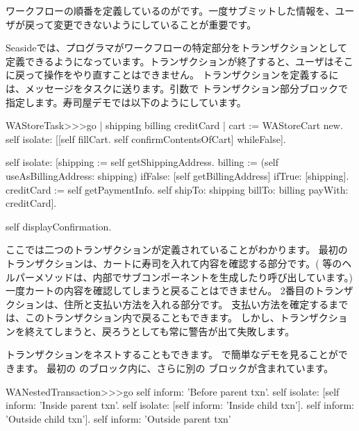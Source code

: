 \documentclass[a4paper,10pt,twoside]{book}
\begin{document}
ワークフローの順番を定義しているのがです。一度サブミットした情報を、ユーザが戻って変更できないようにしていることが重要です。


Seasideでは、プログラマがワークフローの特定部分をトランザクションとして定義できるようになっています。トランザクションが終了すると、ユーザはそこに戻って操作をやり直すことはできません。
トランザクションを定義するには、メッセージをタスクに送ります。引数で
トランザクション部分ブロックで指定します。寿司屋デモでは以下のようにしています。

\begin{code}{}
WAStoreTask>>>go
	| shipping billing creditCard |
	cart := WAStoreCart new.
	self isolate:
		[[self fillCart.
		self confirmContentsOfCart]
			whileFalse].

	self isolate:
		[shipping := self getShippingAddress.
		billing := (self useAsBillingAddress: shipping)
					ifFalse: [self getBillingAddress]
					ifTrue: [shipping].
		creditCard := self getPaymentInfo.
		self shipTo: shipping billTo: billing payWith: creditCard].

	self displayConfirmation.
\end{code}

ここでは二つのトランザクションが定義されていることがわかります。
最初のトランザクションは、カートに寿司を入れて内容を確認する部分です。(  等のヘルパーメソッドは、内部でサブコンポーネントを生成したり呼び出しています。)
一度カートの内容を確認してしまうと戻ることはできません。
2番目のトランザクションは、住所と支払い方法を入れる部分です。
支払い方法を確定するまでは、このトランザクション内で戻ることもできます。
しかし、トランザクションを終えてしまうと、戻ろうとしても常に警告が出て失敗します。

トランザクションをネストすることもできます。
で簡単なデモを見ることができます。
最初の のブロック内に、さらに別の ブロックが含まれています。

\begin{code}{}
WANestedTransaction>>>go
	self inform: 'Before parent txn'.
	self isolate:
			[self inform: 'Inside parent txn'.
			self isolate: [self inform: 'Inside child txn'].
			self inform: 'Outside child txn'].
	self inform: 'Outside parent txn'
\end{code}
\end{document}
